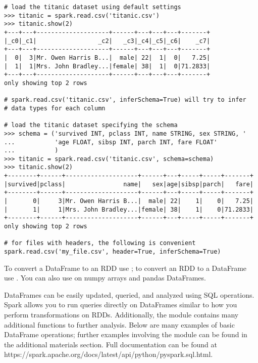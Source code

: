 \begin{lstlisting}
# load the titanic dataset using default settings
>>> titanic = spark.read.csv('titanic.csv')
>>> titanic.show(2)
+---+---+--------------------+------+---+---+---+-------+
|_c0|_c1|                 _c2|   _c3|_c4|_c5|_c6|    _c7|
+---+---+--------------------+------+---+---+---+-------+
|  0|  3|Mr. Owen Harris B...|  male| 22|  1|  0|   7.25|
|  1|  1|Mrs. John Bradley...|female| 38|  1|  0|71.2833|
+---+---+--------------------+------+---+---+---+-------+
only showing top 2 rows

# spark.read.csv('titanic.csv', inferSchema=True) will try to infer
# data types for each column

# load the titanic dataset specifying the schema
>>> schema = ('survived INT, pclass INT, name STRING, sex STRING, '
...			  'age FLOAT, sibsp INT, parch INT, fare FLOAT'
...			  )
>>> titanic = spark.read.csv('titanic.csv', schema=schema)
>>> titanic.show(2)
+--------+------+--------------------+------+---+-----+-----+-------+
|survived|pclass|                name|   sex|age|sibsp|parch|   fare|
+--------+------+--------------------+------+---+-----+-----+-------+
|       0|     3|Mr. Owen Harris B...|  male| 22|    1|    0|   7.25|
|       1|     1|Mrs. John Bradley...|female| 38|    1|    0|71.2833|
+--------+------+--------------------+------+---+-----+-----+-------+
only showing top 2 rows

# for files with headers, the following is convenient
spark.read.csv('my_file.csv', header=True, inferSchema=True)
\end{lstlisting}

\begin{info} 
To convert a DataFrame to an RDD use ; to convert an RDD to a DataFrame use . You can also use  on numpy arrays and pandas DataFrames.
\end{info}

DataFrames can be easily updated, queried, and analyzed using SQL operations. 
Spark allows you to run queries directly on DataFrames similar to how you perform transformations on RDDs. Additionally, the  module contains many additional functions to further analysis.
Below are many examples of basic DataFrame operations; further examples involving the  module can be found in the additional materials section. 
Full documentation can be found at https://spark.apache.org/docs/latest/api/python/pyspark.sql.html.

